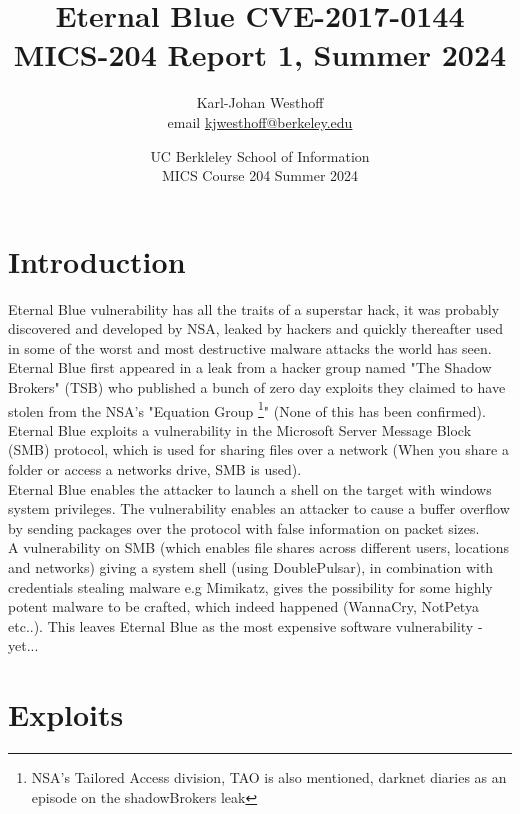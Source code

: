 \documentclass[
	letterpaper, %
	10pt, %
	unnumberedsections, %
	twoside, %
]{LTJournalArticle}
\title{Eternal Blue CVE-2017-0144 \\ MICS-204 Report 1, Summer 2024} %
\author{
	Karl-Johan Westhoff \\
	email \href{mailto:kjwesthoff@berkeley.edu}{kjwesthoff@berkeley.edu}
}
\date{UC Berkleley School of Information \\
MICS Course 204 Summer 2024
}
\begin{document}
\maketitle %


\section{Introduction}
Eternal Blue \cite[CVE-2017-0144]{CVE-2017-0144} vulnerability has all the traits of a superstar hack, it was probably discovered and developed by NSA, leaked by hackers and quickly thereafter used in some of the worst and most destructive malware attacks the world has seen. \\
Eternal Blue first appeared in a leak\cite{Rapid7-on-S0hadow-Broker-Leak} from a hacker group named "The Shadow Brokers"\cite{shadowBrokers-wiki} (TSB) who published a bunch of zero day exploits they claimed to have stolen from the NSA's "Equation Group \footnote{NSA’s Tailored Access division, TAO is also mentioned, darknet diaries as an episode on the shadowBrokers leak}"\cite{kaspersky-eq-group} (None of this has been confirmed). \\
Eternal Blue exploits a vulnerability in the Microsoft Server Message Block (SMB) protocol, which is used for sharing files over a network (When you share a folder or access a networks drive, SMB is used). \\ 
Eternal Blue enables the attacker to launch a shell on the target with windows system privileges. The vulnerability enables an attacker to cause a buffer overflow by sending packages over the protocol with false information on packet sizes.\\
A vulnerability on SMB (which enables file shares across different users, locations and networks) giving a system shell (using DoublePulsar), in combination with credentials stealing malware e.g Mimikatz, gives the possibility for some highly potent malware to be crafted, which indeed happened (WannaCry, NotPetya etc..). This leaves Eternal Blue as the most expensive software vulnerability - yet...  



\section{Exploits} 
\end{document}
